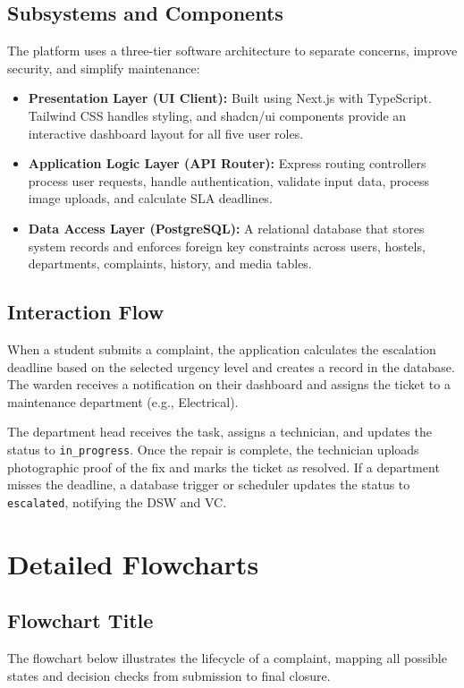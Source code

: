 \documentclass[12pt,a4paper]{article}
\begin{document}
\subsection{Subsystems and Components}
The platform uses a three-tier software architecture to separate concerns, improve security, and simplify maintenance:
\begin{itemize}
    \item \textbf{Presentation Layer (UI Client):} Built using Next.js with TypeScript. Tailwind CSS handles styling, and shadcn/ui components provide an interactive dashboard layout for all five user roles.
    \item \textbf{Application Logic Layer (API Router):} Express routing controllers process user requests, handle authentication, validate input data, process image uploads, and calculate SLA deadlines.
    \item \textbf{Data Access Layer (PostgreSQL):} A relational database that stores system records and enforces foreign key constraints across users, hostels, departments, complaints, history, and media tables.
\end{itemize}

\subsection{Interaction Flow}
When a student submits a complaint, the application calculates the escalation deadline based on the selected urgency level and creates a record in the database. The warden receives a notification on their dashboard and assigns the ticket to a maintenance department (e.g., Electrical). 

The department head receives the task, assigns a technician, and updates the status to \texttt{in\_progress}. Once the repair is complete, the technician uploads photographic proof of the fix and marks the ticket as resolved. If a department misses the deadline, a database trigger or scheduler updates the status to \texttt{escalated}, notifying the DSW and VC.

\newpage
\section{Detailed Flowcharts}

\subsection{Flowchart Title}
The flowchart below illustrates the lifecycle of a complaint, mapping all possible states and decision checks from submission to final closure.
\end{document}
